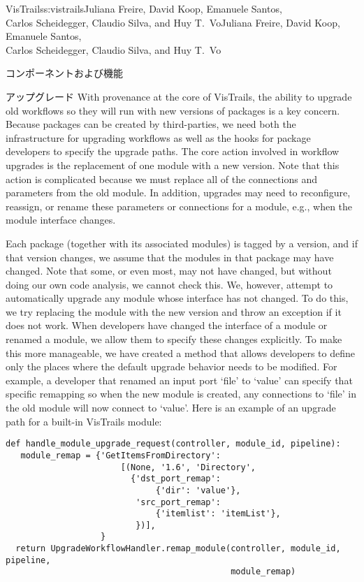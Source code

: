 \begin{aosachaptertoc}{VisTrails}{s:vistrails}{Juliana Freire, David Koop, Emanuele Santos, \\ Carlos Scheidegger, Claudio Silva, and Huy T.\ Vo}{Juliana Freire, David Koop, Emanuele Santos, \\ \hspace*{0.9cm} Carlos Scheidegger, Claudio Silva, and Huy T.\ Vo}
\begin{aosasect1}{コンポーネントおよび機能}
\begin{aosasect2}{アップグレード}
With provenance at the core of VisTrails, the ability to upgrade old
workflows so they will run with new versions of packages is a key
concern.  Because packages can be created by third-parties, we need
both the infrastructure for upgrading workflows as well as the hooks
for package developers to specify the upgrade paths.  The core action
involved in workflow upgrades is the replacement of one module with a
new version.  Note that this action is complicated because we must
replace all of the connections and parameters from the old module.  In
addition, upgrades may need to reconfigure, reassign, or rename these
parameters or connections for a module, e.g., when the module
interface changes.

Each package (together with its associated modules) is tagged by a
version, and if that version changes, we assume that the modules in
that package may have changed.  Note that some, or even most, may not
have changed, but without doing our own code analysis, we cannot check
this.  We, however, attempt to automatically upgrade any module
whose interface has not changed.  To do this, we try replacing the
module with the new version and throw an exception if it does not
work.  When developers have changed the interface of a module or
renamed a module, we allow them to specify these changes explicitly.
To make this more manageable, we have created a 
method that allows developers to define only the places where the
default upgrade behavior needs to be modified.  For example, a
developer that renamed an input port `file' to `value' can specify
that specific remapping so when the new module is created, any
connections to `file' in the old module will now connect to
`value'. Here is an example of an upgrade path for a built-in
VisTrails module:

\begin{verbatim}
def handle_module_upgrade_request(controller, module_id, pipeline):
   module_remap = {'GetItemsFromDirectory':
                       [(None, '1.6', 'Directory',
                         {'dst_port_remap':
                              {'dir': 'value'},
                          'src_port_remap':
                              {'itemlist': 'itemList'},
                          })],
                   }
  return UpgradeWorkflowHandler.remap_module(controller, module_id, pipeline,
                                             module_remap)
\end{verbatim}


\end{aosasect2}
\end{aosasect1}
\end{aosachaptertoc}
